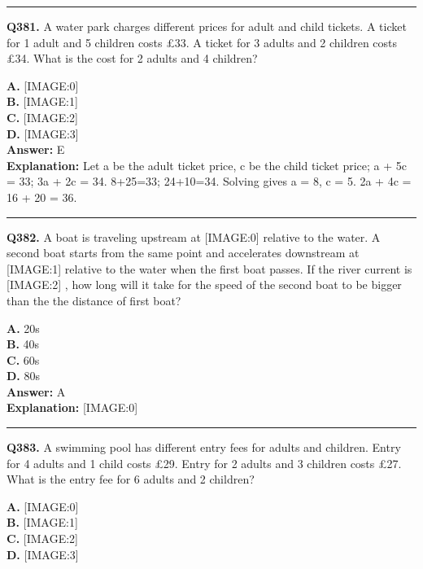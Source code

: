\documentclass[12pt]{article}
\begin{document}
\hrule
\vspace{1em}


\noindent
\textbf{Q381.} A water park charges different prices for adult and child tickets.
A ticket for 1 adult and 5 children costs £33.
A ticket for 3 adults and 2 children costs £34.
What is the cost for 2 adults and 4 children?



\textbf{A.} [IMAGE:0] \\
\textbf{B.} [IMAGE:1] \\
\textbf{C.} [IMAGE:2] \\
\textbf{D.} [IMAGE:3] \\

\textbf{Answer:} E \\
\textbf{Explanation:} Let a be the adult ticket price, c be the child ticket price;
a + 5c = 33; 3a + 2c = 34.
8+25=33; 24+10=34.
Solving gives a = 8, c = 5.
2a + 4c = 16 + 20 = 36.

\hrule
\vspace{1em}


\noindent
\textbf{Q382.} A boat is traveling upstream at
[IMAGE:0]
relative to the water. A second boat starts from the same point and accelerates downstream at
[IMAGE:1]
relative to the water when the first boat passes. If the river current is
[IMAGE:2]
, how long will it take for the speed of the second boat to be bigger than the the distance of first boat?



\textbf{A.} 20s \\
\textbf{B.} 40s \\
\textbf{C.} 60s \\
\textbf{D.} 80s \\

\textbf{Answer:} A \\
\textbf{Explanation:} [IMAGE:0]

\hrule
\vspace{1em}


\noindent
\textbf{Q383.} A swimming pool has different entry fees for adults and children.
Entry for 4 adults and 1 child costs £29.
Entry for 2 adults and 3 children costs £27.
What is the entry fee for 6 adults and 2 children?



\textbf{A.} [IMAGE:0] \\
\textbf{B.} [IMAGE:1] \\
\textbf{C.} [IMAGE:2] \\
\textbf{D.} [IMAGE:3] \\
\end{document}
